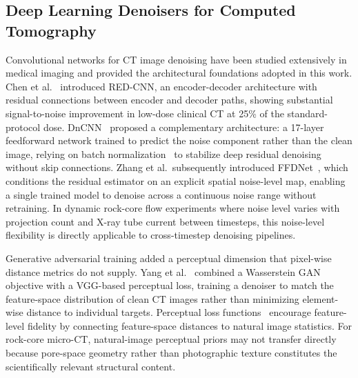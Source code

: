 \documentclass[review,12pt]{elsarticle}
\begin{document}
\subsection{Deep Learning Denoisers for Computed Tomography}
\label{sec:related:dl_ct}

Convolutional networks for CT image denoising have been studied
extensively in medical imaging and provided the architectural
foundations adopted in this work.  Chen et al.~\cite{Chen2017redcnn}
introduced RED-CNN, an encoder-decoder architecture with residual
connections between encoder and decoder paths, showing substantial
signal-to-noise improvement in low-dose clinical CT at 25\% of the
standard-protocol dose.  DnCNN~\cite{Zhang2017dncnn} proposed a
complementary architecture: a 17-layer feedforward network trained to
predict the noise component rather than the clean image, relying on
batch normalization~\cite{Ioffe2015} to stabilize deep residual
denoising without skip connections.  Zhang et al.\ subsequently
introduced FFDNet~\cite{Zhang2018ffdnet}, which conditions the residual
estimator on an explicit spatial noise-level map, enabling a single
trained model to denoise across a continuous noise range without
retraining.  In dynamic rock-core flow experiments where noise level
varies with projection count and X-ray tube current between timesteps,
this noise-level flexibility is directly applicable to cross-timestep
denoising pipelines.

Generative adversarial training added a perceptual dimension that
pixel-wise distance metrics do not supply.  Yang et al.\
\cite{Yang2018wgan} combined a Wasserstein GAN objective with a
VGG-based perceptual loss, training a denoiser to match the
feature-space distribution of clean CT images rather than minimizing
element-wise distance to individual targets.  Perceptual loss
functions~\cite{Johnson2016,Dosovitskiy2016} encourage
feature-level fidelity by connecting feature-space distances to natural
image statistics.  For rock-core micro-CT, natural-image perceptual
priors may not transfer directly because pore-space geometry rather than
photographic texture constitutes the scientifically relevant structural
content.
\end{document}
